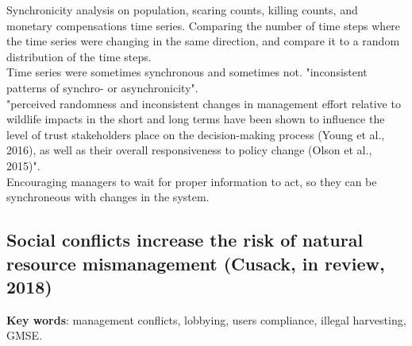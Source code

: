 \documentclass[12pt]{article}
\begin{document}
Synchronicity analysis on population, scaring counts, killing counts, and monetary compensations time series. Comparing the number of time steps where the time series were changing in the same direction, and compare it to a random distribution of the time steps.\\
Time series were sometimes synchronous and sometimes not. "inconsistent patterns of synchro- or asynchronicity".\\
"perceived randomness and inconsistent changes in management effort relative to wildlife impacts
in the short and long terms have been shown to influence the
level of trust stakeholders place on the decision-making process (Young et al., 2016), as well as their overall responsiveness to policy change (Olson et al., 2015)".\\
Encouraging managers to wait for proper information to act, so they can be synchroneous with changes in the system.

\subsection{Social conflicts increase the risk of natural resource mismanagement (Cusack, in review, 2018)}
\textbf{Key words}: management conflicts, lobbying, users compliance, illegal harvesting, GMSE.\\
\end{document}

